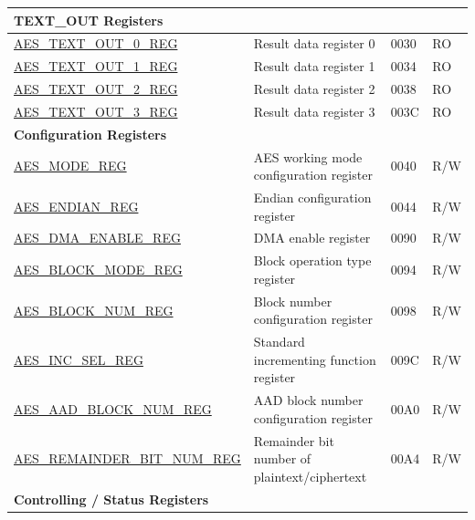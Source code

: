 \begin{longtable}{ | p{5.2cm} | p{6.6cm} | p{2cm} | p{1.2cm} | }
\multicolumn{4}{|l|}{\textbf{TEXT\_OUT Registers}} \\ \hline

\hyperref[regdesc:AESTEXTOUTnREG]{AES\_TEXT\_OUT\_0\_REG}		&	Result data register 0					& \hexprefix{}0030 & RO \\ \hline
\hyperref[regdesc:AESTEXTOUTnREG]{AES\_TEXT\_OUT\_1\_REG}		&	Result data register 1					& \hexprefix{}0034 & RO \\ \hline
\hyperref[regdesc:AESTEXTOUTnREG]{AES\_TEXT\_OUT\_2\_REG}		&	Result data register 2					& \hexprefix{}0038 & RO \\ \hline
\hyperref[regdesc:AESTEXTOUTnREG]{AES\_TEXT\_OUT\_3\_REG}		&	Result data register 3					& \hexprefix{}003C & RO \\ \hline

\multicolumn{4}{|l|}{\textbf{Configuration Registers}} \\ \hline

\hyperref[regdesc:AESMODEREG]{AES\_MODE\_REG}				            &	AES working mode configuration register			    & \hexprefix{}0040 & R/W \\ \hline
\hyperref[regdesc:AESENDIANREG]{AES\_ENDIAN\_REG}			            &	Endian configuration register				        & \hexprefix{}0044 & R/W \\ \hline
\hyperref[regdesc:AESDMAENABLEREG]{AES\_DMA\_ENABLE\_REG}		        &	DMA enable register					                & \hexprefix{}0090 & R/W \\ \hline
\hyperref[regdesc:AESBLOCKMODEREG]{AES\_BLOCK\_MODE\_REG}		        &	Block operation type register			        & \hexprefix{}0094 & R/W \\ \hline
\hyperref[regdesc:AESBLOCKNUMREG]{AES\_BLOCK\_NUM\_REG}		   	        &	Block number configuration register			        & \hexprefix{}0098 & R/W \\ \hline
\hyperref[regdesc:AESINCSELREG]{AES\_INC\_SEL\_REG}			            &	Standard incrementing function register               & \hexprefix{}009C & R/W \\ \hline
\hyperref[regdesc:AESAADBLOCKNUMREG]{AES\_AAD\_BLOCK\_NUM\_REG}	        &	AAD block number configuration register			    & \hexprefix{}00A0 & R/W \\ \hline
\hyperref[regdesc:AESREMAINDERBITNUMREG]{AES\_REMAINDER\_BIT\_NUM\_REG}	&	Remainder bit number of plaintext/ciphertext	    & \hexprefix{}00A4 & R/W \\ \hline

\multicolumn{4}{|l|}{\textbf{Controlling / Status Registers}} \\ \hline


\end{longtable}
